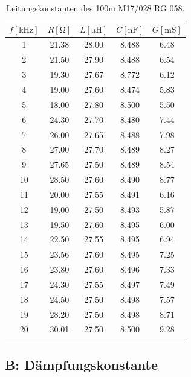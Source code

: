 \begin{table}
\centering
	\caption[]{Leitungskonstanten des 100m M17/028 RG 058.}
	\begin{tabular}{S[table-format=2.0] S[table-format=2.2] S[table-format=2.2] S[table-format=1.3] S[table-format=1.2]}
	\toprule
        {$f[\si{\kilo\hertz}]$} & {$R[\si{\ohm}]$} & {$L[\si{\micro\henry}]$} & {$C[\si{\nano \farad}]$} & {$G[\si{\milli\siemens}]$} \\
			&	21.38	&	28.00	&	8.488	&	6.48\\
			  2	&	21.50	&	27.90	&	8.488	&	6.54\\
			  3	&	19.30	&	27.67	&	8.772	&	6.12\\
			  4	&	19.00	&	27.60	&	8.474	&	5.83\\
			  5	&	18.00	&	27.80	&	8.500	&	5.50\\
			  6	&	24.30	&	27.70	&	8.480	&	7.44\\
			  7	&	26.00	&	27.65	&	8.488	&	7.98\\
			  8	&	27.00	&	27.70	&	8.489	&	8.27\\
			  9	&	27.65	&	27.50	&	8.489	&	8.54\\
			 10	&	28.50	&	27.60	&	8.490	&	8.77\\
			 11	&	20.00	&	27.55	&	8.491	&	6.16\\
			 12	&	19.00	&	27.50	&	8.493	&	5.87\\
			 13	&	19.50	&	27.60	&	8.495	&	6.00\\
			 14	&	22.50	&	27.55	&	8.495	&	6.94\\
			 15	&	23.56	&	27.60	&	8.495	&	7.25\\
			 16	&	23.80	&	27.60	&	8.496	&	7.33\\
			 17	&	24.30	&	27.55	&	8.497	&	7.49\\
			 18	&	24.50	&	27.50	&	8.498	&	7.57\\
			 19	&	28.20	&	27.50	&	8.498	&	8.71\\
			 20	&	30.01	&	27.50	&	8.500	&	9.28\\
			\bottomrule
	\end{tabular}
	\label{tab_konst3}
\end{table}

\FloatBarrier
\subsection{B: Dämpfungskonstante} %
\label{sub:b_}

